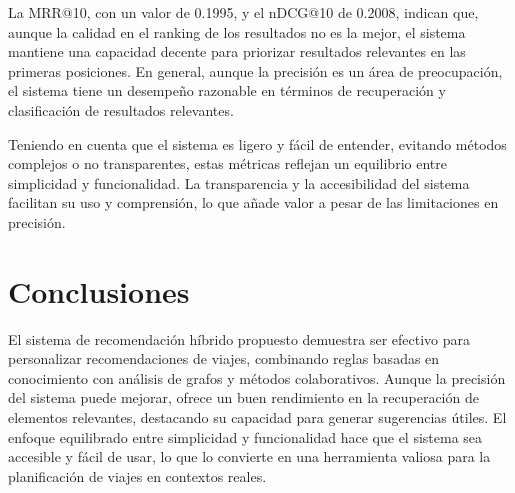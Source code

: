 \documentclass[runningheads]{llncs}
\begin{document}
La MRR@10, con un valor de 0.1995, y el nDCG@10 de 0.2008, indican que, aunque la calidad en el ranking de los resultados no es la mejor, el sistema mantiene una capacidad decente para priorizar resultados relevantes en las primeras posiciones. En general, aunque la precisión es un área de preocupación, el sistema tiene un desempeño razonable en términos de recuperación y clasificación de resultados relevantes.

Teniendo en cuenta que el sistema es ligero y fácil de entender, evitando métodos complejos o no transparentes, estas métricas reflejan un equilibrio entre simplicidad y funcionalidad. La transparencia y la accesibilidad del sistema facilitan su uso y comprensión, lo que añade valor a pesar de las limitaciones en precisión.

\section{Conclusiones}
El sistema de recomendación híbrido propuesto demuestra ser efectivo para personalizar recomendaciones de viajes, combinando reglas basadas en conocimiento con análisis de grafos y métodos colaborativos. Aunque la precisión del sistema puede mejorar, ofrece un buen rendimiento en la recuperación de elementos relevantes, destacando su capacidad para generar sugerencias útiles. El enfoque equilibrado entre simplicidad y funcionalidad hace que el sistema sea accesible y fácil de usar, lo que lo convierte en una herramienta valiosa para la planificación de viajes en contextos reales.
\end{document}
